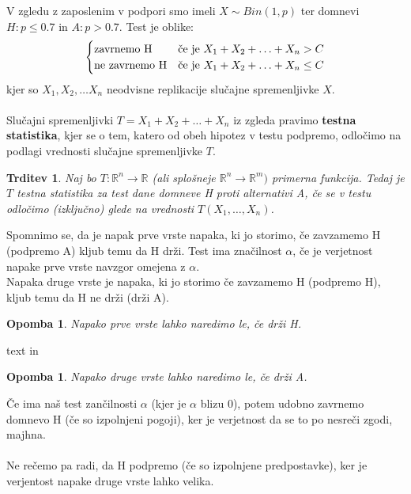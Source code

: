 \documentclass[11pt]{article}
\newtheorem{Trditev}[Izrek]{{\sc Trditev}}
\newtheorem{Opomba}[Izrek]{{\sc Opomba}}
\begin{document}
	V zgledu z zaposlenim v podpori smo imeli $X\sim Bin(1,p)$ ter domnevi $H: p\le 0.7$ in $A: p>0.7$. Test je oblike:
		\[
	\begin{cases}
	\textnormal{zavrnemo H} & \textnormal{če je } X_1 + X_2 +\ldots + X_n > C\\
	\textnormal{ne zavrnemo H} & \textnormal{če je }  X_1 + X_2 +\ldots + X_n \le C
	\end{cases}
	\]
	kjer so $X_1, X_2,\ldots X_n$ neodvisne replikacije slučajne spremenljivke $X$.
	\\
	\\
	Slučajni spremenljivki $ T = X_1 + X_2 +\ldots + X_n$ iz zgleda pravimo \textbf{testna statistika}, kjer se o tem, katero od obeh hipotez v testu podpremo, odločimo na podlagi vrednosti slučajne spremenljivke $T$.
	\begin{Trditev}
			Naj bo $T: \mathbb{R}^n \to \mathbb{R}$ (ali splošneje $\mathbb{R}^n \to \mathbb{R}^m)$ primerna funkcija. Tedaj je $T$ testna statistika za test dane domneve H proti alternativi A, če se v testu odločimo (izključno) glede na vrednosti $T(X_1, \ldots, X_n)$.
	\end{Trditev}
	
	Spomnimo se, da je napak prve vrste napaka, ki jo storimo, če zavzamemo H (podpremo A) kljub temu da H drži. Test ima značilnost $\alpha$, če je verjetnost napake prve vrste navzgor omejena z $\alpha$.
	\\
	Napaka druge vrste je napaka, ki jo storimo če zavzamemo H (podpremo H), kljub temu da H ne drži (drži A).
	\begin{Opomba}
		Napako prve vrste lahko naredimo le, če drži H.
	\end{Opomba}text in 
	\begin{Opomba}
		Napako druge vrste lahko naredimo le, če drži A.
	\end{Opomba}
	Če ima naš test zančilnosti $\alpha$ (kjer je $\alpha$ blizu 0), potem udobno zavrnemo domnevo H (če so izpolnjeni pogoji), ker je verjetnost da se to po nesreči zgodi, majhna.
	\\
	\\
	Ne rečemo pa radi, da H podpremo (če so izpolnjene predpostavke), ker je verjentost napake druge vrste lahko velika.
\end{document}
